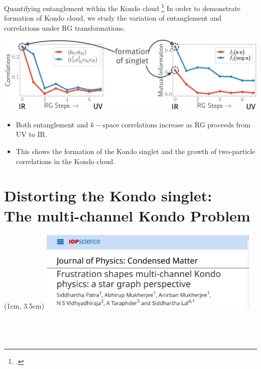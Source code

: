\documentclass[aspectratio=169]{beamer}
\begin{document}
\begin{frame}{Quantifying entanglement within the Kondo cloud}
\footcite{anirban_kondo}
In order to demonstrate formation of Kondo cloud, we study the \alert{variation of entanglement} and correlations under RG transformations.

\vspace*{\fill}
\includegraphics[width=\textwidth]{kondoRevRG.pdf}

\vspace*{\fill}
\begin{itemize}
	\item Both entanglement and \(k-\)space correlations \alert{increase} as RG proceeds from UV to IR.\\[10pt]
	\item This shows the formation of the \alert{Kondo singlet} and the growth of two-particle correlations in the \alert{Kondo cloud}.
\end{itemize}
\end{frame}

\section{Distorting the Kondo singlet:\\ The multi-channel Kondo Problem\vspace*{20pt}}
\begin{textblock*}{\textwidth}(1cm, 3.5cm)
\includegraphics[width=0.8\textwidth]{MCKJPCM.pdf}
\end{textblock*}
\subsection{~}
\end{document}
